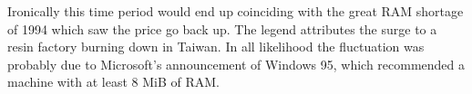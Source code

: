 \pagebreak
{}
Ironically this time period would end up coinciding with the great RAM shortage of 1994 which saw the price go back up. The legend attributes the surge to a resin factory burning down in Taiwan. In all likelihood the fluctuation was probably due to Microsoft's announcement of Windows 95, which recommended a machine with at least 8 MiB of RAM.

